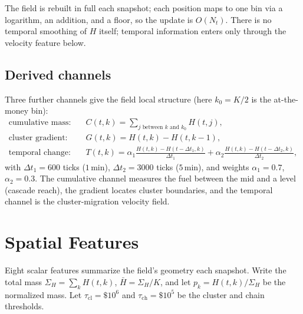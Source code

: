\documentclass[11pt,a4paper]{article}
\theoremstyle{definition}
\theoremstyle{plain}
\begin{document}
The field is rebuilt in full each snapshot; each position maps to one bin via a logarithm, an
addition, and a floor, so the update is $O(N_t)$. There is no temporal smoothing of $H$ itself;
temporal information enters only through the velocity feature below.

\subsection{Derived channels}

Three further channels give the field local structure (here $k_0 = K/2$ is the at-the-money bin):
\begin{align}
  \text{cumulative mass:} \quad & C(t,k) = \textstyle\sum_{j \text{ between } k \text{ and } k_0} H(t,j),
    \label{eq:cumulative}\\
  \text{cluster gradient:} \quad & G(t,k) = H(t,k) - H(t,k-1),
    \label{eq:gradient}\\
  \text{temporal change:} \quad & T(t,k) = \alpha_1 \frac{H(t,k)-H(t-\Delta t_1,k)}{\Delta t_1}
                                          + \alpha_2 \frac{H(t,k)-H(t-\Delta t_2,k)}{\Delta t_2},
    \label{eq:temporal}
\end{align}
with $\Delta t_1 = 600$ ticks ($1$\,min), $\Delta t_2 = 3000$ ticks ($5$\,min), and weights
$\alpha_1 = 0.7$, $\alpha_2 = 0.3$. The cumulative channel measures the fuel between the mid and a
level (cascade reach), the gradient locates cluster boundaries, and the temporal channel is the
cluster-migration velocity field.

\section{Spatial Features}
\label{sec:features}

Eight scalar features summarize the field's geometry each snapshot. Write the total mass
$\Sigma_H = \sum_k H(t,k)$, $\bar H = \Sigma_H/K$, and let $p_k = H(t,k)/\Sigma_H$ be the
normalized mass. Let $\tau_{\text{cl}} = \$10^6$ and $\tau_{\text{ch}} = \$10^5$ be the cluster and
chain thresholds.
\end{document}
